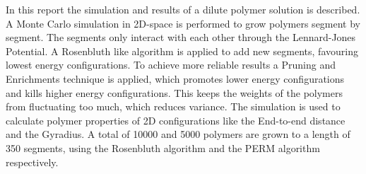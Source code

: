 In this report the simulation and results of a dilute polymer solution is described.  A Monte Carlo simulation in 2D-space is performed to grow polymers segment by segment. The segments only interact with each other through the Lennard-Jones Potential. A Rosenbluth like algorithm is applied to add new segments, favouring lowest energy configurations. To achieve more reliable results a Pruning and Enrichments technique is applied, which promotes lower energy configurations and kills higher energy configurations. This keeps the weights of the polymers from fluctuating too much, which reduces variance. The simulation is used to calculate polymer properties of 2D configurations like the End-to-end distance and the Gyradius. A total of 10000 and 5000 polymers are grown to a length of 350 segments, using the Rosenbluth algorithm and the PERM algorithm respectively.